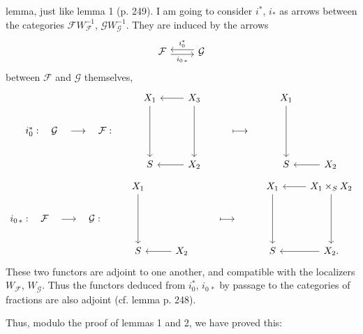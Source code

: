 lemma, just like lemma 1 (p. 249). I am going to consider $i^*$, $i_*$ as arrows between the categories $\mathcal{F}W_{\mathcal{F}}^{-1}$, $\mathcal{G}W_{\mathcal{G}}^{-1}$. They are induced by the arrows %
\[
\begin{tikzcd}[ampersand replacement=\&]
\mathcal{F} \arrow[r, shift right, "i_{0\,*}"'] \& \mathcal{G} \arrow[l, shift right, "i_0^*"']
\end{tikzcd}
\]
between $\mathcal{F}$ and $\mathcal{G}$ themselves, %
\[
\begin{tikzcd}[ampersand replacement=\&]
 \& X_1 \arrow[dd] \& X_3 \arrow[l] \arrow[dd] \& \& X_1 \arrow[dd] \& \\
i_0^* :\quad \mathcal{G}\quad\longrightarrow\quad\mathcal{F} : \& \& \& \longmapsto \& \& \\
 \& S \& X_2 \arrow[l] \& \& S \& X_2 \arrow[l]
\end{tikzcd}
\]
\[
\begin{tikzcd}[ampersand replacement=\&]
 \& X_1 \arrow[dd] \& \& \& X_1 \arrow[dd] \& X_1\times_S X_2 \arrow[l] \arrow[dd] \\
i_{0\,*} :\quad \mathcal{F}\quad\longrightarrow\quad\mathcal{G} : \& \& \& \longmapsto \& \& \\
 \& S \& X_2 \arrow[l] \& \& S \& X_2. \arrow[l]
\end{tikzcd}
\]
These two functors are adjoint to one another, and compatible with the localizers $W_{\mathcal{F}}$, $W_{\mathcal{G}}$. Thus the functors deduced from $i_0^*$, $i_{0\,*}$ by passage to the categories of fractions are also adjoint (cf. lemma p. 248).

Thus, modulo the proof of lemmas 1 and 2, we have proved this:



